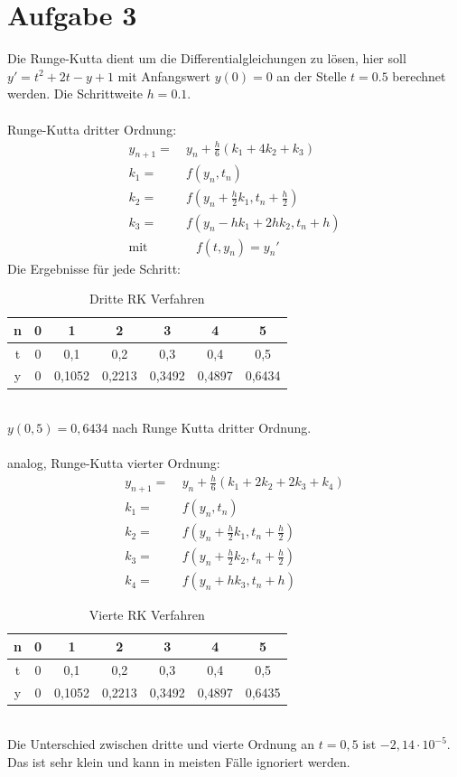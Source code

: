 \section{Aufgabe 3}
Die Runge-Kutta dient um die Differentialgleichungen zu lösen, hier soll $y' = t^2 + 2t - y + 1$ mit Anfangswert $y(0) = 0$ an der Stelle $t=0.5$ berechnet werden. Die Schrittweite $h = 0.1$.\\\\
Runge-Kutta dritter Ordnung:
\begin{align}
	y_{n+1} = & \  y_n + \frac{h}{6} (k_1 + 4k_2 + k_3) \\
	k_1 = & \  f(y_n,t_n) \\
	k_2 = & \  f(y_n + \frac{h}{2}k_1, t_n + \frac{h}{2}) \\
	k_3 = & \  f(y_n - hk_1 + 2hk_2, t_n + h) \\
	\text{mit} & \quad  f(t,y_n) = y_n'
\end{align}
Die Ergebnisse für jede Schritt:
\begin{table}[htpb]\centering
	\begin{tabular}{|c|c|c|c|c|c|c|}
		\hline
		n & 0 & 1  & 2  & 3  & 4  & 5  \\ \hline
		t &0     & 0,1    & 0,2    & 0,3    & 0,4    & 0,5    \\ \hline
		y & 0     & 0,1052 & 0,2213 & 0,3492 & 0,4897 & 0,6434 \\ \hline
	\end{tabular}
	\caption{Dritte RK Verfahren}
\end{table}\\
$y(0,5) = 0,6434$ nach Runge Kutta dritter Ordnung. \\\\
analog, Runge-Kutta vierter Ordnung: 
\begin{align} \label{2}
	y_{n+1} = & \  y_n + \frac{h}{6} (k_1 + 2k_2 +2 k_3 + k_4) \\
	k_1 = & \  f(y_n,t_n) \\
	k_2 = & \  f(y_n + \frac{h}{2}k_1, t_n + \frac{h}{2}) \\
	k_3 = & \  f(y_n + \frac{h}{2}k_2, t_n + \frac{h}{2}) \\
	k_4 = & \  f(y_n + hk_3,t_n + h) \label{3}
\end{align}
\begin{table}[htpb]\centering
	\begin{tabular}{|c|c|c|c|c|c|c|}
		\hline
		n & 0 & 1  & 2  & 3  & 4  & 5  \\ \hline
		t &0     & 0,1    & 0,2    & 0,3    & 0,4    & 0,5    \\ \hline
		y & 0     & 0,1052 & 0,2213 & 0,3492 & 0,4897 & 0,6435 \\ \hline
	\end{tabular}
	\caption{Vierte RK Verfahren}
\end{table}\\
Die Unterschied zwischen dritte und vierte Ordnung an $t = 0,5$ ist $-2,14 \cdot 10^{-5}$. Das ist sehr klein und kann in meisten Fälle ignoriert werden.  \clearpage

